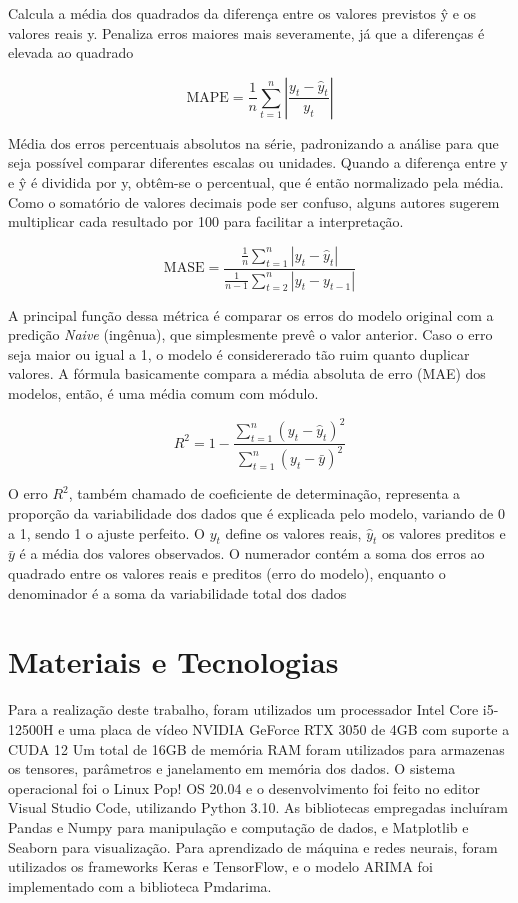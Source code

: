 Calcula a média dos quadrados da diferença entre os valores previstos ŷ e os valores reais y. Penaliza erros maiores mais severamente, já que a diferenças é elevada ao quadrado

\begin{equation}
    \text{MAPE} = \frac{1}{n} \sum_{t=1}^{n} \left|\frac{y_t - \hat{y}_t}{y_t}\right|
\end{equation}

Média dos erros percentuais absolutos na série, padronizando a análise para que seja possível comparar diferentes escalas ou unidades.
Quando a diferença entre y e ŷ é dividida por y, obtêm-se o percentual, que é então normalizado pela média. Como o somatório de valores decimais pode ser confuso, alguns autores sugerem multiplicar cada resultado por 100 para facilitar a interpretação.


\begin{equation}
    \text{MASE} = \frac{\frac{1}{n} \sum_{t=1}^{n} |y_t - \hat{y}_t|}{\frac{1}{n-1}\sum_{t=2}^{n} |y_t - y_{t-1}|}
\end{equation}

A principal função dessa métrica é comparar os erros do modelo original com a predição \textit{Naive} (ingênua), que simplesmente prevê o valor anterior.
Caso o erro seja maior ou igual a 1, o modelo é considererado tão ruim quanto duplicar valores.
A fórmula basicamente compara a média absoluta de erro (MAE) dos modelos, então, é uma média comum com módulo.

\begin{equation}
    R^2 = 1 - \frac{\sum_{t=1}^{n} (y_t - \hat{y}_t)^2}{\sum_{t=1}^{n}(y_t - \bar{y})^2}
\end{equation}

O erro $R^2$, também chamado de coeficiente de determinação, representa a proporção da variabilidade dos dados que é explicada pelo modelo, variando de 0 a 1, sendo 1 o ajuste perfeito.
O $y_t$ define os valores reais, $\hat{y}_t$ os valores preditos e $\bar{y}$ é a média dos valores observados. O numerador contém a soma dos erros ao quadrado entre os valores reais e preditos (erro do modelo), enquanto o denominador é a soma da variabilidade total dos dados

\section{Materiais e Tecnologias} \label{sec:materiais}
Para a realização deste trabalho, 
foram utilizados um processador Intel Core i5-12500H e
uma placa de vídeo NVIDIA GeForce RTX 3050 de 4GB com suporte a CUDA 12
Um total de 16GB de memória RAM foram utilizados para armazenas os tensores, parâmetros e janelamento em memória dos dados. 
O sistema operacional foi o Linux Pop! OS 20.04 e o desenvolvimento foi feito no editor Visual Studio Code, utilizando Python 3.10. As bibliotecas empregadas incluíram Pandas e Numpy para manipulação e computação de dados, e Matplotlib e Seaborn para visualização. Para aprendizado de máquina e redes neurais, foram utilizados os frameworks Keras e TensorFlow, e o modelo ARIMA foi implementado com a biblioteca Pmdarima.